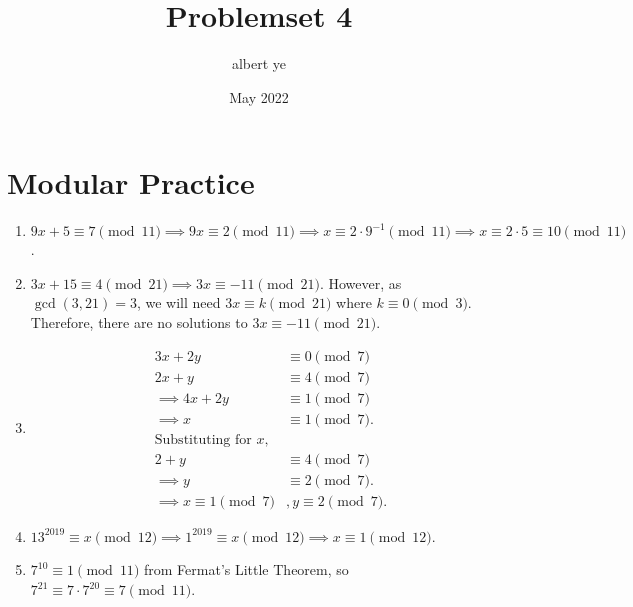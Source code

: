 \documentclass{article}
\title{Problemset 4}
\author{albert ye}
\date{May 2022}
\begin{document}
	\maketitle
	\section{Modular Practice}
	\begin{enumerate}[label=\alph*)]
		\item $9x+5 \equiv 7 \pmod{11} \implies 9x \equiv 2 \pmod{11} \implies x \equiv 2 \cdot 9^{-1} \pmod{11} 
			\implies x \equiv 2 \cdot 5 \equiv \boxed{10} \pmod{11}$.
		\item $3x+15 \equiv 4 \pmod{21} \implies 3x \equiv -11 \pmod{21}$. However, as $\gcd(3, 21) = 3$, we will need
			$3x \equiv k \pmod{21}$	where $k \equiv 0 \pmod 3$. Therefore, there are no solutions to $3x \equiv -11 \pmod{21}$.
		\item \begin{align*}{}
			3x + 2y &\equiv 0 \pmod 7 \\
			2x + y &\equiv 4 \pmod 7 \\
			\implies 4x + 2y &\equiv 1 \pmod 7 \\
			\implies x &\equiv 1 \pmod 7. \\
			\text{Substituting for }x, \\
			2 + y &\equiv 4 \pmod 7 \\
			\implies y &\equiv 2 \pmod 7. \\
			\implies \boxed{x \equiv 1 \pmod 7} &, \boxed{y \equiv 2 \pmod 7}.
		\end{align*}
		\item $13^{2019} \equiv x \pmod{12} \implies 1^{2019} \equiv x \pmod{12} \implies \boxed{x \equiv 1 \pmod{12}}$.
		\item $7^{10} \equiv 1 \pmod{11}$ from Fermat's Little Theorem, so $7^{21} \equiv 7 \cdot 7^{20} \equiv \boxed{7 \pmod{11}}$.
	\end{enumerate}

	\newpage
\end{document}
